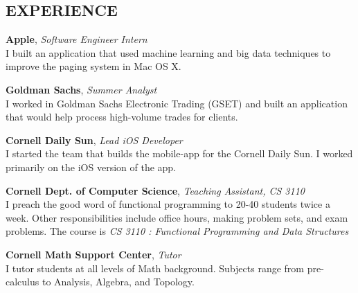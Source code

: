 \documentclass[line,margin]{res}
\begin{document}
\address{225 N. Columbus Ave, Apt. 2408, Chicago, IL 14853}
\address{{\bf Phone:} (845) 664-5697 {\bf Email:} bkc39@cornell.edu}

\begin{resume}
  \section{EXPERIENCE}
  {\bf Apple}, {\textit{Software Engineer Intern}} \\
  I built an application that used machine learning and big data
  techniques to improve the paging system in Mac OS X.
  \vspace{-1em}

  {\bf Goldman Sachs}, {\textit{Summer Analyst}} \\
  I worked in Goldman Sachs Electronic Trading (GSET) and built an
  application that would help process high-volume trades for clients.
  \vspace{-1em}

  {\bf Cornell Daily Sun}, {\textit{Lead iOS Developer}} \\
  I started the team that builds the mobile-app for the Cornell Daily
  Sun. I worked primarily on the iOS version of the app.
  \vspace{-1em}

  {\bf Cornell Dept. of Computer Science}, \textit{Teaching Assistant,
    CS 3110} \\
  I preach the good word of functional programming to 20-40 students
  twice a week. Other responsibilities include office hours, making
  problem sets, and exam problems. The course is {\it CS 3110 : Functional
  Programming and Data Structures}
  \vspace{-1em}

  {\bf Cornell Math Support Center}, \textit{Tutor} \\
  I tutor students at all levels of Math background. Subjects range
  from pre-calculus to Analysis, Algebra, and Topology.


\end{resume}
\end{document}
